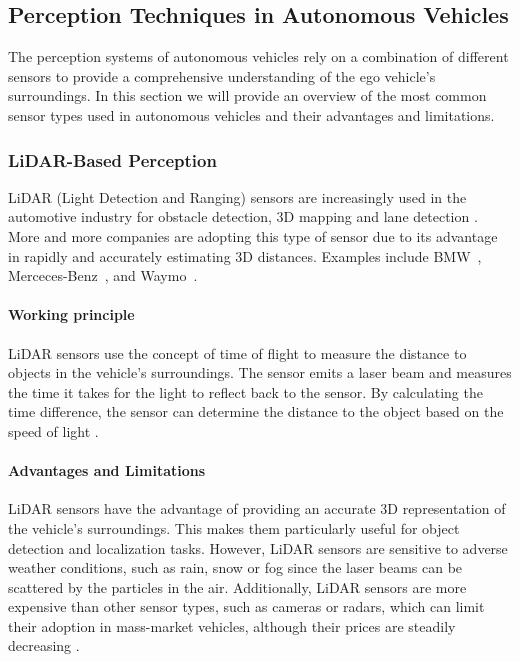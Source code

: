 \subsection{Perception Techniques in Autonomous Vehicles}

The perception systems of autonomous vehicles rely on a combination of different sensors to provide a 
comprehensive understanding of the ego vehicle's surroundings. In this section we will provide an overview of
the most common sensor types used in autonomous vehicles and their advantages and limitations.

\subsubsection{LiDAR-Based Perception}

LiDAR (Light Detection and Ranging) sensors are increasingly used in the automotive industry for 
obstacle detection, 3D mapping and lane detection \cite{autonomous_vehicles_perception_survey}. More and more companies are adopting this type of sensor due to its advantage 
in rapidly and accurately estimating 3D distances. Examples include BMW~\cite{lidarbased_bmw}, 
Merceces-Benz~\cite{lidarbased_mercedes}, and Waymo~\cite{lidarbased_waymo}.

\paragraph{Working principle}

LiDAR sensors use the concept of time of flight to measure the distance to objects in the vehicle's surroundings.
The sensor emits a laser beam and measures the time it takes for the light to reflect back to the sensor.
By calculating the time difference, the sensor can determine the distance to the object based 
on the speed of light \cite{lidarbased_review}.

\paragraph{Advantages and Limitations}

LiDAR sensors have the advantage of providing an accurate 3D representation of the vehicle's surroundings.
This makes them particularly useful for object detection and localization tasks. However, LiDAR sensors
are sensitive to adverse weather conditions, such as rain, snow or fog since the laser beams can be scattered
by the particles in the air. Additionally, LiDAR sensors are more expensive than other sensor types, such as
cameras or radars, which can limit their adoption in mass-market vehicles, although their prices are steadily decreasing \cite{autonomous_vehicles_perception_survey}.

